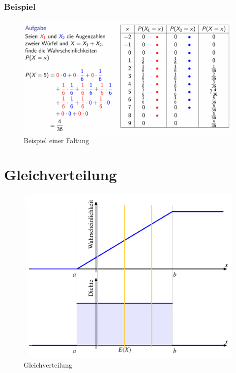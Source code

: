 \documentclass[../Main.tex]{subfiles}
\begin{document}
\subsubsection{Beispiel}

\begin{figure}[H]
    \centering
    \includegraphics[width=1\linewidth]{Images/faltung-beispiel.png}
    \caption{Beispiel einer Faltung}
\end{figure}

\section{Gleichverteilung}

\begin{figure}[H]
    \centering
    \includegraphics[width=0.75\linewidth]{Images/gleichverteilung.png}
    \caption{Gleichverteilung}
\end{figure}
\end{document}
